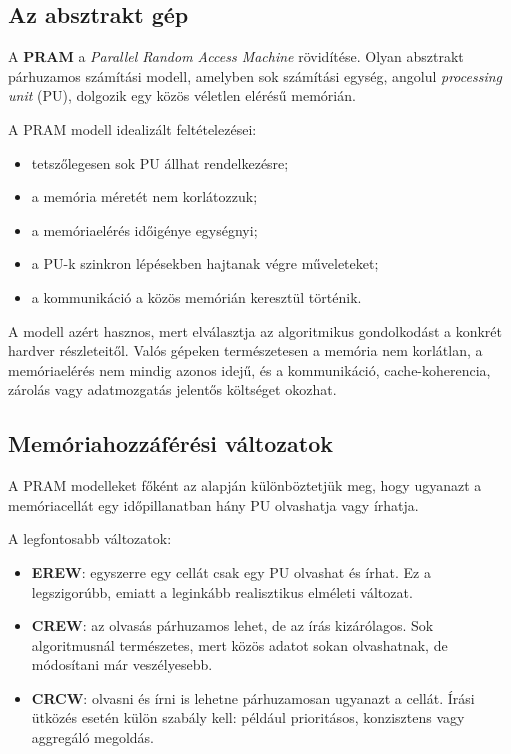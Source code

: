 \subsection{Az absztrakt gép}

A \textbf{PRAM} a \emph{Parallel Random Access Machine} rövidítése. Olyan absztrakt párhuzamos számítási modell, amelyben sok számítási egység, angolul \emph{processing unit} (PU), dolgozik egy közös véletlen elérésű memórián.



A PRAM modell idealizált feltételezései:

\begin{itemize}
  \item tetszőlegesen sok PU állhat rendelkezésre;
  \item a memória méretét nem korlátozzuk;
  \item a memóriaelérés időigénye egységnyi;
  \item a PU-k szinkron lépésekben hajtanak végre műveleteket;
  \item a kommunikáció a közös memórián keresztül történik.
\end{itemize}

A modell azért hasznos, mert elválasztja az algoritmikus gondolkodást a konkrét hardver részleteitől. Valós gépeken természetesen a memória nem korlátlan, a memóriaelérés nem mindig azonos idejű, és a kommunikáció, cache-koherencia, zárolás vagy adatmozgatás jelentős költséget okozhat.

\subsection{Memóriahozzáférési változatok}

A PRAM modelleket főként az alapján különböztetjük meg, hogy ugyanazt a memóriacellát egy időpillanatban hány PU olvashatja vagy írhatja.

\begin{center}

\end{center}

A legfontosabb változatok:

\begin{itemize}
  \item \textbf{EREW}: egyszerre egy cellát csak egy PU olvashat és írhat. Ez a legszigorúbb, emiatt a leginkább realisztikus elméleti változat.
  \item \textbf{CREW}: az olvasás párhuzamos lehet, de az írás kizárólagos. Sok algoritmusnál természetes, mert közös adatot sokan olvashatnak, de módosítani már veszélyesebb.
  \item \textbf{CRCW}: olvasni és írni is lehetne párhuzamosan ugyanazt a cellát. Írási ütközés esetén külön szabály kell: például prioritásos, konzisztens vagy aggregáló megoldás.
\end{itemize}

